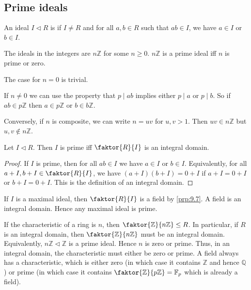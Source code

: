 \subsection{Prime ideals}
\begin{definition}
	An ideal $I \triangleleft R$ is  if $I \neq R$ and for all $a,b \in R$ such that $ab \in I$, we have $a \in I$ or $b \in I$.
\end{definition}

\begin{example}
	The ideals in the integers are $n \mathbb{Z}$ for some $n \geq 0$.
	$n\mathbb Z$ is a prime ideal iff $n$ is prime or zero.

	The case for $n = 0$ is trivial.

	If $n \neq 0$ we can use the property that $p \mid ab$ implies either $p \mid a$ or $p \mid b$.
	So if $ab \in p \mathbb{Z}$ then $a \in p \mathbb{Z}$ or $b \in b \mathbb{Z}$.

	Conversely, if $n$ is composite, we can write $n = uv$ for $u, v > 1$.
	Then $uv \in n\mathbb Z$ but $u,v \not\in n\mathbb Z$.
\end{example}

\begin{proposition} \label{prp:9.8}
	Let $I \triangleleft R$.
	Then $I$ is prime iff $\faktor{R}{I}$ is an integral domain.
\end{proposition}

\begin{proof}
	If $I$ is prime, then for all $ab \in I$ we have $a \in I$ or $b \in I$.
	Equivalently, for all $a + I, b + I \in \faktor{R}{I}$, we have $(a+I)(b+I) = 0+I$ if $a+I = 0+I$ or $b+I = 0+I$.
	This is the definition of an integral domain.
\end{proof}

\begin{remark}
	If $I$ is a maximal ideal, then $\faktor{R}{I}$ is a field by \cref{prp:9.7}.
	A field is an integral domain.
	Hence any maximal ideal is prime.
\end{remark}

\begin{remark}
	If the characteristic of a ring is $n$, then $\faktor{\mathbb Z}{n\mathbb Z} \leq R$.
	In particular, if $R$ is an integral domain, then $\faktor{\mathbb Z}{n\mathbb Z}$ must be an integral domain.
	Equivalently, $n\mathbb Z \triangleleft \mathbb Z$ is a prime ideal.
	Hence $n$ is zero or prime.
	Thus, in an integral domain, the characteristic must either be zero or prime.
	A field always has a characteristic, which is either zero (in which case it contains $\mathbb Z$ and hence $\mathbb Q$) or prime (in which case it contains $\faktor{\mathbb Z}{p\mathbb Z} = \mathbb F_p$ which is already a field).
\end{remark}
